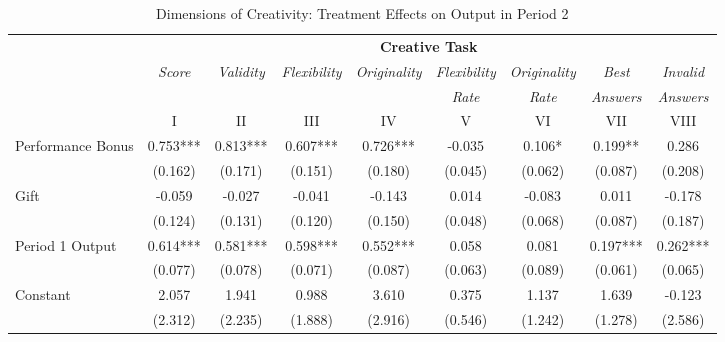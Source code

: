 \begin{landscape}
\begin{table}[h]%
\captionsetup{justification=centering}
\setlength\tabcolsep{2pt}
\caption{Dimensions of Creativity: Treatment Effects on Output in Period 2}
\label{tab:CreativityBreakdown}
\begin{center}%
{\small\renewcommand{\arraystretch}{1}%
\begin{tabular}{lcccccccc}
\hline\noalign{\smallskip}
 & \multicolumn{8}{c}{\textbf{Creative Task}} \\
 & \textit{Score} & \textit{Validity} & \textit{Flexibility} & \textit{Originality} & \textit{Flexibility} & \textit{Originality} & \textit{Best} & \textit{Invalid} \\
 &                                     &                                       &                                               &                                       &       \textit{Rate}           &       \textit{Rate}           &       \textit{Answers}                &       \textit{Answers} \\
 & I & II & III & IV & V & VI & VII & VIII \\
\hline
Performance Bonus   &       0.753***&       0.813***&       0.607***&       0.726***&      -0.035   &       0.106*  &       0.199** &       0.286   \\
                    &     (0.162)   &     (0.171)   &     (0.151)   &     (0.180)   &     (0.045)   &     (0.062)   &     (0.087)   &     (0.208)   \\
Gift                &      -0.059   &      -0.027   &      -0.041   &      -0.143   &       0.014   &      -0.083   &       0.011   &      -0.178   \\
                    &     (0.124)   &     (0.131)   &     (0.120)   &     (0.150)   &     (0.048)   &     (0.068)   &     (0.087)   &     (0.187)   \\
Period 1 Output     &       0.614***&       0.581***&       0.598***&       0.552***&       0.058   &       0.081   &       0.197***&       0.262***\\
                    &     (0.077)   &     (0.078)   &     (0.071)   &     (0.087)   &     (0.063)   &     (0.089)   &     (0.061)   &     (0.065)   \\
Constant            &       2.057   &       1.941   &       0.988   &       3.610   &       0.375   &       1.137   &       1.639   &      -0.123   \\
                    &     (2.312)   &     (2.235)   &     (1.888)   &     (2.916)   &     (0.546)   &     (1.242)   &     (1.278)   &     (2.586)   \\

\end{tabular}}
\end{center}
\end{table}
\end{landscape}
